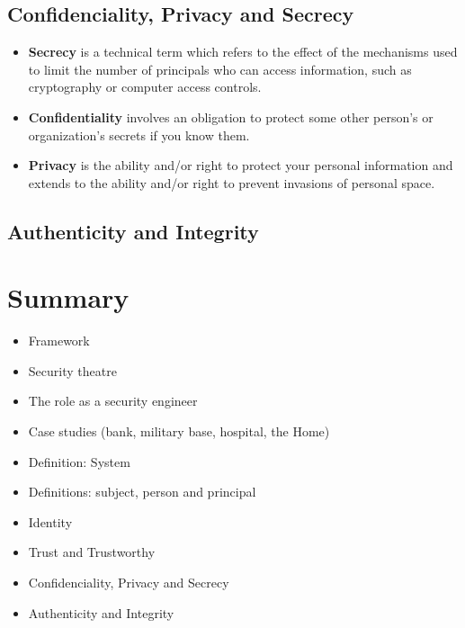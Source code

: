 \subsection{Confidenciality, Privacy and Secrecy}
	\begin{itemize}
		\item {\bf Secrecy} is a technical term which refers to the effect of the mechanisms
		used to limit the number of principals who can access information, such
		as cryptography or computer access controls.
		\item {\bf Confidentiality} involves an obligation to protect some other person’s 
		or organization’s secrets if you know them.
		\item {\bf Privacy} is the ability and/or right to protect your personal information
		and extends to the ability and/or right to prevent invasions of personal space.
	\end{itemize}

\subsection{Authenticity and Integrity}


\clearpage
\section*{Summary}
\begin{itemize}
	\item Framework
	\item Security theatre
	\item The role as a security engineer
	\item Case studies (bank, military base, hospital, the Home)
	\item Definition: System
	\item Definitions: subject, person and principal
	\item Identity
	\item Trust and Trustworthy
	\item Confidenciality, Privacy and Secrecy
	\item Authenticity and Integrity
\end{itemize}

 